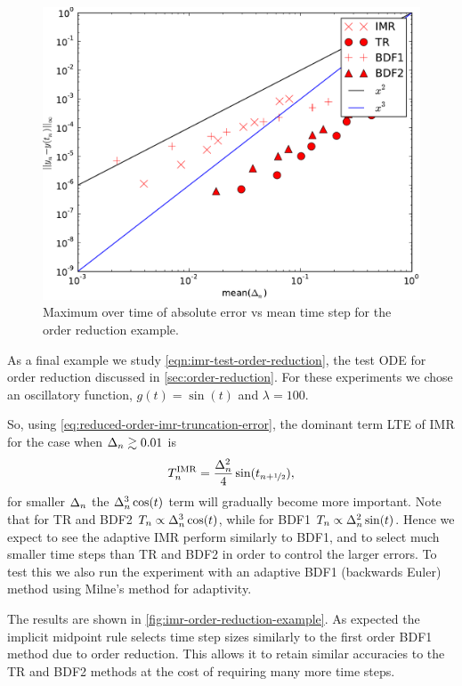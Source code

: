 \begin{figure}
  \centering  \includegraphics[width=1\textwidth]{plots/aimr_odes/order_reduction-maxoferrornormsvsmeanofdts.pdf}
  \caption{Maximum over time of absolute error vs mean time step for the order reduction example.}
  \label{fig:imr-order-reduction-convergence}
\end{figure}

As a final example we study \eqref{eqn:imr-test-order-reduction}, the test ODE for order reduction discussed in \autoref{sec:order-reduction}.
For these experiments we chose an oscillatory function, $g(t) = \sin(t)$ and $\lambda = 100$.

So, using \eqref{eq:reduced-order-imr-truncation-error}, the dominant term LTE of IMR for the case when $\Delta_{n} \gtrsim 0.01$ is
\begin{equation}
  T_n^{\text{IMR}} = \frac{\Delta_{n}^2}{4} \sin(t_{n+\nicefrac{1}{2}}),
\end{equation}
for smaller $\Delta_{n}$ the $\Delta_{n}^3 \cos(t)$ term will gradually become more important.
Note that for TR and BDF2 $T_n \propto \Delta_{n}^3 \cos(t)$, while for BDF1 $T_n \propto \Delta_{n}^2 \sin(t)$.
Hence we expect to see the adaptive IMR perform similarly to BDF1, and to select much smaller time steps than TR and BDF2 in order to control the larger errors.
To test this we also run the experiment with an adaptive BDF1 (backwards Euler) method using Milne's method for adaptivity.

The results are shown in \autoref{fig:imr-order-reduction-example}. 
As expected the implicit midpoint rule selects time step sizes similarly to the first order BDF1 method due to order reduction.
This allows it to retain similar accuracies to the TR and BDF2 methods at the cost of requiring many more time steps.

